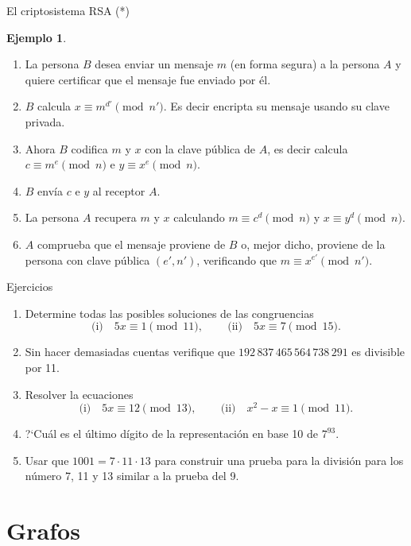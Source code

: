 \documentclass[11pt,spanish,makeidx]{amsbook}
\theoremstyle{definition}
\newtheorem{ejemplo}{Ejemplo}[section]
\theoremstyle{remark}
\begin{document}
\begin{section}{El criptosistema RSA (*)}
\begin{ejemplo}
\begin{enumerate}
\item La persona $B$ desea enviar un mensaje $m$ (en forma segura) a la persona $A$ y quiere certificar que el mensaje fue enviado por él.
\item $B$ calcula $x \equiv m^{d'} \pmod{n'}$. Es decir encripta su mensaje usando su  clave privada.
\item Ahora $B$ codifica $m$ y $x$ con la clave pública de $A$, es decir calcula $c \equiv m^{e} \pmod{n}$ e  $y \equiv x^e \pmod{n}$. 
\item $B$ envía $c$ e $y$ al receptor $A$.
\item La persona $A$ recupera $m$ y $x$ calculando  $m \equiv c^d \pmod{n}$ y  $x \equiv y^d \pmod{n}$. 
\item $A$ comprueba que el mensaje  proviene de $B$ o, mejor dicho, proviene de la persona con clave pública $(e',n')$, verificando que $m \equiv x^{e'} \pmod{n'}$. 
\end{enumerate}

\end{ejemplo}
\end{section}

\begin{section}{Ejercicios}
\begin{enumerate}
\item Determine todas las posibles soluciones de las congruencias
$$
\text{(i)}\quad 5x\equiv1 \pmod{11},\qquad\, \text{(ii)}\quad 5x\equiv 7 \pmod{15}.
$$
\item Sin hacer demasiadas cuentas verifique que $192\,837\,465\,564\,738\,291$ es divisible por 11.
\item Resolver la ecuaciones
$$
\text{(i)}\quad 5x\equiv12 \pmod{13},\qquad\, \text{(ii)}\quad x^2-x \equiv 1 \pmod{11}.
$$
\item ?`Cuál es el último dígito de la representación en base 10 de $7^{93}$.
\item Usar que $1001=7\cdot 11 \cdot 13$ para construir una prueba para la división para los número 7, 11 y 13 similar a la prueba del 9.
\end{enumerate}
\end{section}

\chapter[Grafos]{Grafos}
\end{document}
